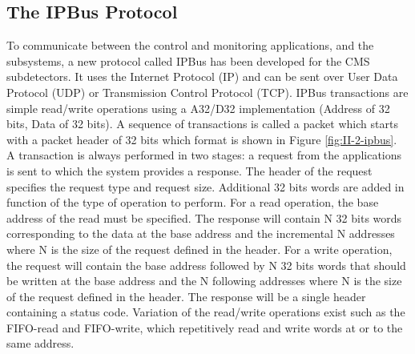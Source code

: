     \subsection{The IPBus Protocol}
    \label{sec:II-2-ipbus}

      To communicate between the control and monitoring applications, and the subsystems, a new protocol called IPBus has been developed for the CMS subdetectors. It uses the Internet Protocol (IP) and can be sent over User Data Protocol (UDP) or Transmission Control Protocol (TCP). IPBus transactions are simple read/write operations using a A32/D32 implementation (Address of 32 bits, Data of 32 bits). A sequence of transactions is called a packet which starts with a packet header of 32 bits which format is shown in Figure \ref{fig:II-2-ipbus}. \\

      A transaction is always performed in two stages: a request from the applications is sent to which the system provides a response. The header of the request specifies the request type and request size. Additional 32 bits words are added in function of the type of operation to perform. For a read operation, the base address of the read must be specified. The response will contain N 32 bits words corresponding to the data at the base address and the incremental N addresses where N is the size of the request defined in the header. For a write operation, the request will contain the base address followed by N 32 bits words that should be written at the base address and the N following addresses where N is the size of the request defined in the header. The response will be a single header containing a status code. Variation of the read/write operations exist such as the FIFO-read and FIFO-write, which repetitively read and write words at or to the same address. \\

